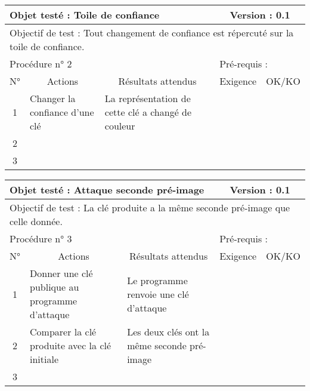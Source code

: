 \documentclass{../res/univ-projet}
\begin{document}
\begin{center}
    \begin{tabular}{|c|p{5cm}|p{5cm}|p{1.5cm}|p{1.5cm}|}
      \hline
      \multicolumn{3}{|l|}{Objet testé : Toile de confiance} & \multicolumn{2}{c|}{Version : 0.1}\\ \hline
      \multicolumn{5}{|l|}{Objectif de test : Tout changement de confiance est répercuté sur la toile de confiance.}\\ \hline
      \multicolumn{3}{|l|}{Procédure n° 2} & \multicolumn{2}{p{3cm}|}{Pré-requis : }\\ \hline
      \multicolumn{1}{|c|}{N°} & \multicolumn{1}{c|}{Actions} & \multicolumn{1}{c|}{Résultats attendus} & 
      \multicolumn{1}{c|}{Exigence} & \multicolumn{1}{c|}{OK/KO}\\ \hline
      1 & Changer la confiance d'une clé & La représentation de cette clé a changé de couleur &  & \\
      2 &  &  &  & \\
      3 &  &  &  & \\ \hline
    \end{tabular}
    \vskip 2.2cm



    \begin{tabular}{|c|p{5cm}|p{5cm}|p{1.5cm}|p{1.5cm}|}
      \hline
      \multicolumn{3}{|l|}{Objet testé : Attaque seconde pré-image} & \multicolumn{2}{c|}{Version : 0.1}\\ \hline
      \multicolumn{5}{|l|}{Objectif de test : La clé produite a la même seconde pré-image que celle donnée.}\\ \hline
      \multicolumn{3}{|l|}{Procédure n° 3} & \multicolumn{2}{p{3cm}|}{Pré-requis : }\\ \hline
      \multicolumn{1}{|c|}{N°} & \multicolumn{1}{c|}{Actions} & \multicolumn{1}{c|}{Résultats attendus} & 
      \multicolumn{1}{c|}{Exigence} & \multicolumn{1}{c|}{OK/KO}\\ \hline
      1 & Donner une clé publique au programme d'attaque & Le programme renvoie une clé d'attaque &  & \\
      2 & Comparer la clé produite avec la clé initiale & Les deux clés ont la même seconde pré-image &  & \\
      3 &  &  &  & \\ \hline
    \end{tabular}
    \vskip 2.2cm




\end{center}
\end{document}
